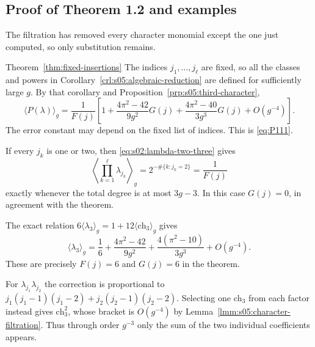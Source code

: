 \subsection{Proof of Theorem 1.2 and examples}
\label{subsec:s05:03}

The filtration has removed every character monomial except the one
just computed, so only substitution remains.

\begin{prfn}{Theorem~\ref{thm:fixed-insertions}}
The indices $j_1,\ldots,j_\ell$ are fixed, so all the classes and
powers in Corollary~\ref{crl:s05:algebraic-reduction} are defined
for sufficiently large $g$. By that corollary and
Proposition~\ref{prp:s05:third-character},
\[
 \langle P(\lambda)\rangle_g
 =\frac1{F(j)}\left[
 1+\frac{4\pi^2-42}{9g^2}G(j)
  +\frac{4\pi^2-40}{3g^3}G(j)+O(g^{-4})\right].
\]
The error constant may depend on the fixed list of indices.
This is \eqref{eq:P111}.
\end{prfn}

\begin{exm}
If every $j_k$ is one or two, then
\eqref{eq:s02:lambda-two-three} gives
\[
 \left\langle\prod_{k=1}^{\ell}\lambda_{j_k}\right\rangle_g
 =2^{-\#\{k:j_k=2\}}=\frac1{F(j)}
\]
exactly whenever the total degree is at most $3g-3$.
In this case $G(j)=0$, in agreement with the theorem.
\end{exm}

\begin{exm}
The exact relation
$6\langle\lambda_3\rangle_g=1+12\langle\mathrm{ch}_3\rangle_g$
gives
\[
 \langle\lambda_3\rangle_g
 =\frac16+\frac{4\pi^2-42}{9g^2}
          +\frac{4(\pi^2-10)}{3g^3}+O(g^{-4}).
\]
These are precisely $F(j)=6$ and $G(j)=6$ in the theorem.
\end{exm}

\begin{exm}
For $\lambda_{j_1}\lambda_{j_2}$ the correction is proportional to
$j_1(j_1-1)(j_1-2)+j_2(j_2-1)(j_2-2)$.
Selecting one $\mathrm{ch}_3$ from each factor instead gives
$\mathrm{ch}_3^2$, whose bracket is $O(g^{-4})$ by
Lemma~\ref{lmm:s05:character-filtration}. Thus through order
$g^{-3}$ only the sum of the two individual coefficients appears.
\end{exm}
